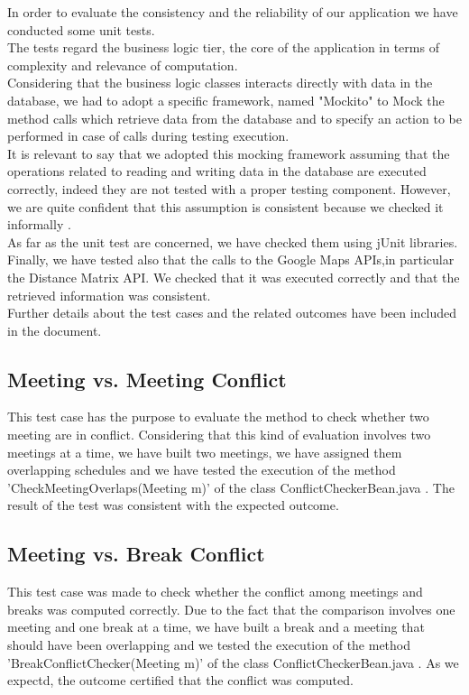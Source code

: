In order to evaluate the consistency and the reliability of our application we have conducted some unit tests. \\
The tests regard the business logic tier, the core of the application in terms of complexity and relevance of computation.\\
Considering that the business logic classes interacts directly with data in the database, we had to adopt a specific framework, named "Mockito" to Mock the method calls which retrieve data from the database and to specify an action to be performed in case of calls during testing execution.\\
It is relevant to say that we adopted this mocking framework assuming that the operations related to reading and writing data in the database are executed correctly, indeed they are not tested with a proper testing component. However, we are quite confident that this assumption is consistent because we checked it informally .\\
As far as the unit test are concerned, we have checked them using jUnit libraries.\\
Finally, we have tested also that the calls to the Google Maps APIs,in particular the Distance Matrix API. We checked that it was executed correctly and that the  retrieved information was consistent.\\ 
Further details about the test cases and the related outcomes have been included in the document.\\


\subsection{Meeting vs. Meeting Conflict}
This test case has the purpose to evaluate the method to check whether two meeting are in conflict. Considering that this kind of evaluation involves two meetings at a time, we have  built two meetings, we have assigned them overlapping schedules and we have tested the execution of the method 'CheckMeetingOverlaps(Meeting m)' of the class ConflictCheckerBean.java . The result of the test was consistent with the expected outcome. 

\subsection{Meeting vs. Break Conflict}
This test case was made to check whether the conflict among meetings and breaks was computed correctly. Due to the fact that the comparison involves one meeting and one break at a time, we have built a break and a meeting that should have been overlapping and we tested the execution of the method 'BreakConflictChecker(Meeting m)' of the class ConflictCheckerBean.java . As we expectd, the outcome certified that the conflict was computed. 

